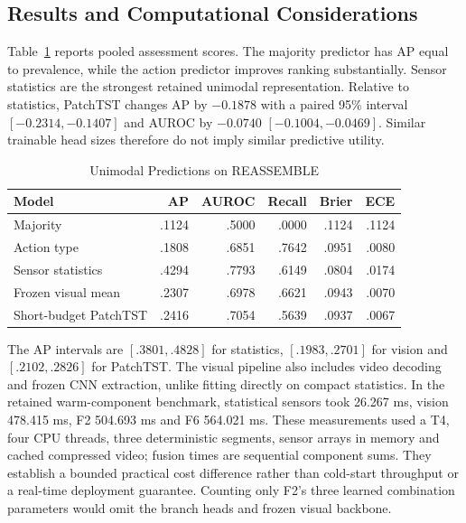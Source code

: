 \subsection{Results and Computational Considerations}
Table~\ref{tab:reassemble-unimodal} reports pooled assessment scores. The majority predictor has AP equal to prevalence, while the action predictor improves ranking substantially. Sensor statistics are the strongest retained unimodal representation. Relative to statistics, PatchTST changes AP by $-0.1878$ with a paired 95\% interval $[-0.2314,-0.1407]$ and AUROC by $-0.0740$ $[-0.1004,-0.0469]$. Similar trainable head sizes therefore do not imply similar predictive utility.

\begin{table}[htbp]
\caption{Unimodal Predictions on REASSEMBLE}\label{tab:reassemble-unimodal}
\centering\small

\begin{tabular*}{\linewidth}{@{\extracolsep{\fill}}lrrrrr@{}}\toprule
Model & AP & AUROC & Recall & Brier & ECE\\\midrule
Majority & .1124 & .5000 & .0000 & .1124 & .1124\\
Action type & .1808 & .6851 & .7642 & .0951 & .0080\\
Sensor statistics & .4294 & .7793 & .6149 & .0804 & .0174\\
Frozen visual mean & .2307 & .6978 & .6621 & .0943 & .0070\\
Short-budget PatchTST & .2416 & .7054 & .5639 & .0937 & .0067\\\bottomrule
\end{tabular*}
\end{table}

The AP intervals are $[.3801,.4828]$ for statistics, $[.1983,.2701]$ for vision and $[.2102,.2826]$ for PatchTST. The visual pipeline also includes video decoding and frozen CNN extraction, unlike fitting directly on compact statistics. In the retained warm-component benchmark, statistical sensors took 26.267 ms, vision 478.415 ms, F2 504.693 ms and F6 564.021 ms. These measurements used a T4, four CPU threads, three deterministic segments, sensor arrays in memory and cached compressed video; fusion times are sequential component sums. They establish a bounded practical cost difference rather than cold-start throughput or a real-time deployment guarantee. Counting only F2's three learned combination parameters would omit the branch heads and frozen visual backbone.

